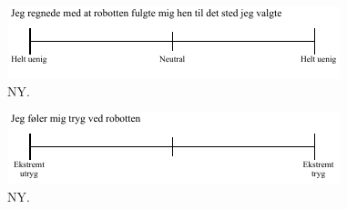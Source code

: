 \noindent
%
%
\begin{figure}[H]
\centering
\includegraphics[width =\textwidth]{Figure/UdvalgteSkalaer/RobottenFulgteMigDetRigtigeStedHen} 
\caption{NY.}
\label{fig:SkalaRFulgteMigDetRigtigeStedHen}
\end{figure}
\noindent
%
%
\begin{figure}[H]
\centering
\includegraphics[width =\textwidth]{Figure/UdvalgteSkalaer/TrygVedR} 
\caption{NY.}
\label{fig:SkalaTrygVedR}
\end{figure}
\noindent
%

